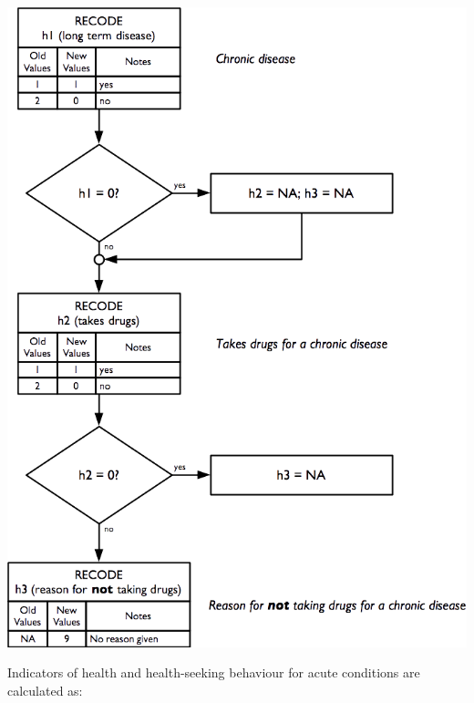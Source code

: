 \documentclass[12pt,a4paper]{book}
\theoremstyle{definition}
\theoremstyle{definition}
\theoremstyle{definition}
\theoremstyle{remark}
\begin{document}
\begin{center}\includegraphics[width=9.76in]{figures/indicators21} \end{center}

\newpage

Indicators of health and health-seeking behaviour for acute conditions
are calculated as:
\end{document}
